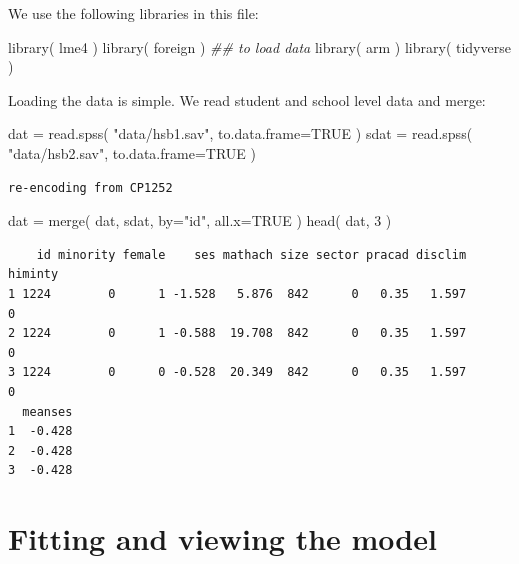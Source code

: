 \documentclass[
  letterpaper,
  DIV=11,
  numbers=noendperiod]{scrreprt}
\newenvironment{Shaded}{\begin{snugshade}}{\end{snugshade}}
\newcommand{\AttributeTok}[1]{\textcolor[rgb]{0.49,0.56,0.16}{#1}}
\newcommand{\ConstantTok}[1]{\textcolor[rgb]{0.53,0.00,0.00}{#1}}
\newcommand{\DecValTok}[1]{\textcolor[rgb]{0.25,0.63,0.44}{#1}}
\newcommand{\DocumentationTok}[1]{\textcolor[rgb]{0.73,0.13,0.13}{\textit{#1}}}
\newcommand{\FunctionTok}[1]{\textcolor[rgb]{0.02,0.16,0.49}{#1}}
\newcommand{\NormalTok}[1]{\textcolor[rgb]{0.00,0.44,0.13}{#1}}
\newcommand{\OtherTok}[1]{\textcolor[rgb]{0.00,0.44,0.13}{#1}}
\newcommand{\StringTok}[1]{\textcolor[rgb]{0.25,0.44,0.63}{#1}}
\begin{document}
We use the following libraries in this file:

\begin{Shaded}
\begin{Highlighting}[]
\FunctionTok{library}\NormalTok{( lme4 )}
\FunctionTok{library}\NormalTok{( foreign ) }\DocumentationTok{\#\# to load data}
\FunctionTok{library}\NormalTok{( arm )}
\FunctionTok{library}\NormalTok{( tidyverse )}
\end{Highlighting}
\end{Shaded}

Loading the data is simple. We read student and school level data and
merge:

\begin{Shaded}
\begin{Highlighting}[]
\NormalTok{dat }\OtherTok{=} \FunctionTok{read.spss}\NormalTok{( }\StringTok{"data/hsb1.sav"}\NormalTok{, }\AttributeTok{to.data.frame=}\ConstantTok{TRUE}\NormalTok{ )}
\NormalTok{sdat }\OtherTok{=} \FunctionTok{read.spss}\NormalTok{( }\StringTok{"data/hsb2.sav"}\NormalTok{, }\AttributeTok{to.data.frame=}\ConstantTok{TRUE}\NormalTok{ )}
\end{Highlighting}
\end{Shaded}

\begin{verbatim}
re-encoding from CP1252
\end{verbatim}

\begin{Shaded}
\begin{Highlighting}[]
\NormalTok{dat }\OtherTok{=} \FunctionTok{merge}\NormalTok{( dat, sdat, }\AttributeTok{by=}\StringTok{"id"}\NormalTok{, }\AttributeTok{all.x=}\ConstantTok{TRUE}\NormalTok{ )}
\FunctionTok{head}\NormalTok{( dat, }\DecValTok{3}\NormalTok{ )}
\end{Highlighting}
\end{Shaded}

\begin{verbatim}
    id minority female    ses mathach size sector pracad disclim himinty
1 1224        0      1 -1.528   5.876  842      0   0.35   1.597       0
2 1224        0      1 -0.588  19.708  842      0   0.35   1.597       0
3 1224        0      0 -0.528  20.349  842      0   0.35   1.597       0
  meanses
1  -0.428
2  -0.428
3  -0.428
\end{verbatim}

\hypertarget{fitting-and-viewing-the-model}{%
\section{Fitting and viewing the
model}\label{fitting-and-viewing-the-model}}
\end{document}
